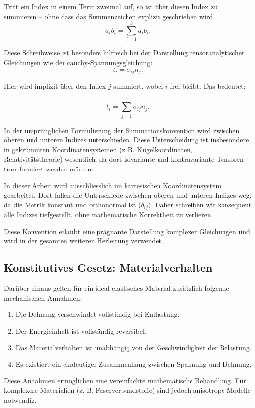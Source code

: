 \medskip
\begin{definition} 
	Tritt ein Index in einem Term zweimal auf, so ist über diesen Index zu summieren – ohne dass das Summenzeichen explizit geschrieben wird.
\begin{equation}
	a_i b_i = 
	\sum_{i=1}^3 a_i b_i.
\end{equation}
\end{definition} 
Diese Schreibweise ist besonders hilfreich bei der Darstellung tensoranalytischer Gleichungen wie der cauchy-Spannungsgleichung:
\begin{equation}
	t_i = 
	\sigma_{ij} n_j.
\end{equation}

Hier wird implizit über den Index $j$ summiert, wobei $i$ frei bleibt. Das bedeutet:

\begin{equation}
	t_i = 
	\sum_{j=1}^{3} \sigma_{ij} n_j.
\end{equation}

In der ursprünglichen Formulierung der Summationskonvention wird zwischen oberen und unteren Indizes unterschieden. 
Diese Unterscheidung ist insbesondere in gekrümmten Koordinatensystemen (z.\,B. Kugelkoordinaten, Relativitätstheorie) wesentlich, da dort kovariante und kontravariante Tensoren transformiert werden müssen.

In dieser Arbeit wird ausschliesslich im kartesischen Koordinatensystem gearbeitet. Dort fallen die Unterschiede zwischen oberen und unteren Indizes weg, da die Metrik konstant und orthonormal ist ($\delta_{ij}$). 
Daher schreiben wir konsequent alle Indizes tiefgestellt, ohne mathematische Korrektheit zu verlieren.

Diese Konvention erlaubt eine prägnante Darstellung komplexer Gleichungen und wird in der gesamten weiteren Herleitung verwendet.

\subsection{Konstitutives Gesetz: Materialverhalten}
Darüber hinaus gelten für ein ideal elastisches Material zusätzlich folgende mechanischen Annahmen:
\begin{enumerate}
	\item Die Dehnung verschwindet vollständig bei Entlastung.
	\item Der Energieinhalt ist vollständig reversibel.
	\item Das Materialverhalten ist unabhängig von der Geschwindigkeit der Belastung.
	\item Es existiert ein eindeutiger Zusammenhang zwischen Spannung und Dehnung.
\end{enumerate}
Diese Annahmen ermöglichen eine vereinfachte mathematische Behandlung. 
Für komplexere Materialien (z. B. Faserverbundstoffe) sind jedoch anisotrope Modelle notwendig.

